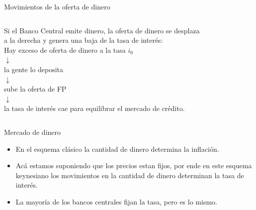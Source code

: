 \documentclass{beamer}
\begin{document}
\begin{frame}{Movimientos de la oferta de dinero}
    \begin{columns}
    Si el Banco Central emite dinero, la oferta de dinero se desplaza a la derecha y genera una baja de la tasa de interés: \\ \vspace{2mm}
    \footnotesize
    \centering
    Hay exceso de oferta de dinero a la tasa $i_0$ \\  $\downarrow$ \\ la gente lo deposita \\ $\downarrow$ \\ sube la oferta de FP \\ $\downarrow$ \\ la tasa de interés cae para equilibrar el mercado de crédito.

    \begin{center}
    \begin{figure}[h!]
    \begin{center}
    \end{center}
    \end{figure}
    \end{center} 
    \end{columns}
\end{frame}

\begin{frame}{Mercado de dinero}
    \begin{itemize}
        \item En el esquema clásico la cantidad de dinero determina la inflación.
        \item Acá estamos suponiendo que los precios estan fijos, por ende en este esquema keynesiano los movimientos en la cantidad de dinero determinan la tasa de interés.
        \item La mayoría de los bancos centrales fijan la tasa, pero es lo mismo.    
    \end{itemize}
\end{frame}
\end{document}
